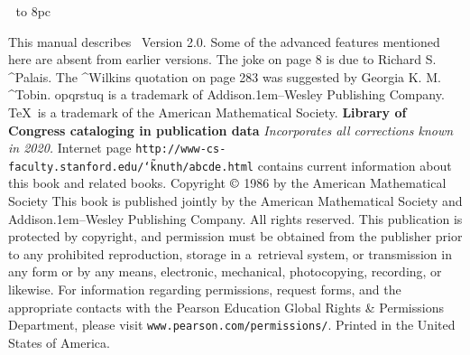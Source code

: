 \kern24pt
\eject
\titlepage
\eightpoint
\vbox to 8pc{}
\noindent\strut
This manual describes \MF\ Version 2.0. Some
of the advanced features mentioned here are absent from earlier versions.
\medskip
\noindent
The joke on page 8 is due to Richard S. ^{Palais}.
\medskip
\noindent
The ^{Wilkins} quotation on page 283 was suggested by Georgia K. M. ^{Tobin}.
\medskip
\noindent
{\manual opqrstuq} is a trademark of Addison\kern.1em--Wesley
 Publishing Company.
\medskip
\noindent
\TeX\ is a trademark of the American Mathematical Society.
\bigskip\medskip
\noindent
{\bf Library of Congress cataloging in publication data}
\medskip
{\tt{}}
\vfill
\noindent
{\sl \kern-1pt Incorporates all corrections known in 2020.}
\smallskip
\noindent
Internet page {\tt http://www-cs-faculty.stanford.edu/\char`\~
  knuth/abcde.html}
contains current information about this book and related books.
\smallskip
\noindent
Copyright $\copyright$ 1986 by the American Mathematical Society
\smallskip
\noindent
This book is published jointly by the American Mathematical Society
and Addison\kern.1em--Wesley Publishing Company.
All rights reserved.
This publication is protected by copyright, and permission must be
obtained from the publisher prior to any prohibited reproduction, storage in
a~retrieval system, or transmission in any form or by any means, electronic,
mechanical, photocopying, recording, or likewise. For information regarding
permissions, request forms, and the appropriate contacts with the
Pearson Education Global Rights \& Permissions Department, please visit
 {\tt www.pearson.com/permissions/}.
Printed in the United States of America. %
